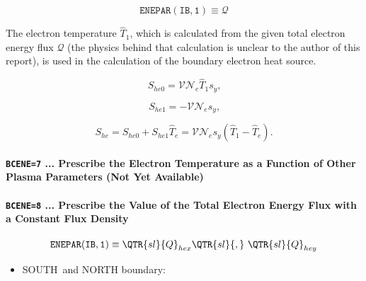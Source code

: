 \documentclass[11pt]{article}
\begin{document}
\bigskip

\begin{equation*}
\mathtt{ENEPAR(IB,1)}\equiv\mathcal{Q}
\end{equation*}

\bigskip

The electron temperature $\widehat{T}_{1}$, which is calculated from the
given total electron energy flux $\mathcal{Q}$ (the physics behind that
calculation is unclear to the author of this report), is used in the
calculation of the boundary electron heat source.

\bigskip

\begin{equation}
S_{he0}=\mathcal{VN}_{e}\widehat{T}_{1}s_{y}\text{,}   \label{c211}
\end{equation}

\begin{equation}
S_{he1}=-\mathcal{VN}_{e}s_{y}\text{,}   \label{c212}
\end{equation}

\begin{equation}
S_{he}=S_{he0}+S_{he1}\widehat{T}_{e}=\mathcal{VN}_{e}s_{y}\left( \widehat
{T}_{1}-\widehat{T}_{e}\right) \text{.}   \label{c213}
\end{equation}

\bigskip

\paragraph{\texttt{BCENE=7} ... Prescribe the Electron Temperature as a
Function of Other Plasma Parameters (Not Yet Available)}

\bigskip

\bigskip

\paragraph{\texttt{BCENE=8} ... Prescribe the Value of the Total Electron
Energy Flux with a Constant Flux Density}

\bigskip

\begin{equation*}
\mathtt{ENEPAR(IB,1)}\equiv\QTR{sl}{Q}_{hex}\QTR{sl}{,}\text{ }\QTR{sl}{Q}%
_{hey}
\end{equation*}

\bigskip

\begin{itemize}
\item  SOUTH\ and NORTH boundary:
\end{itemize}
\end{document}
